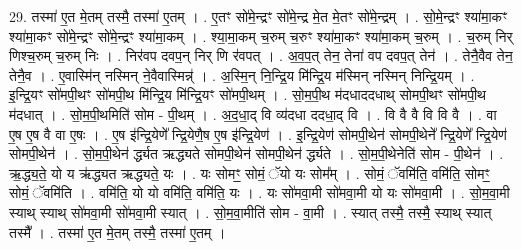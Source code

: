 \documentclass[17pt]{extarticle}
\begin{document}
29. तस्मा॑ ए॒त मे॒तम् तस्मै॒ तस्मा॑ ए॒तम् । . ए॒तꣳ सो॑मे॒न्द्रꣳ सो॑मे॒न्द्र मे॒त मे॒तꣳ सो॑मे॒न्द्रम् । . सो॒मे॒न्द्रꣳ श्या॑मा॒कꣳ श्या॑मा॒कꣳ सो॑मे॒न्द्रꣳ सो॑मे॒न्द्रꣳ श्या॑मा॒कम् । . श्या॒मा॒कम् च॒रुम् च॒रुꣳ श्या॑मा॒कꣳ श्या॑मा॒कम् च॒रुम् । . च॒रुम् निर् णिश्च॒रुम् च॒रुम् निः । . निर॑वप दवप॒न् निर् णि र॑वपत् । . अ॒व॒प॒त् तेन॒ तेना॑ वप दवप॒त् तेन॑ । . तेनै॒वैव तेन॒ तेनै॒व । . ए॒वास्मि॑न् नस्मिन् ने॒वैवास्मिन्न्॑ । . अ॒स्मि॒न् नि॒न्द्रि॒य मि॑न्द्रि॒य म॑स्मिन् नस्मिन् निन्द्रि॒यम् । . इ॒न्द्रि॒यꣳ सो॑मपी॒थꣳ सो॑मपी॒थ मि॑न्द्रि॒य मि॑न्द्रि॒यꣳ सो॑मपी॒थम् । . सो॒म॒पी॒थ म॑दधाददधाथ् सोमपी॒थꣳ सो॑मपी॒थ म॑दधात् । . सो॒म॒पी॒थमिति॑ सोम - पी॒थम् । . अ॒द॒धा॒द् वि व्य॑दधा ददधा॒द् वि । . वि वै वै वि वि वै । . वा ए॒ष ए॒ष वै वा ए॒षः । . ए॒ष इ॑न्द्रि॒येणे᳚ न्द्रि॒येणै॒ष ए॒ष इ॑न्द्रि॒येण॑ । . इ॒न्द्रि॒येण॑ सोमपी॒थेन॑ सोमपी॒थेने᳚ न्द्रि॒येणे᳚ न्द्रि॒येण॑ सोमपी॒थेन॑ । . सो॒म॒पी॒थेन॑ र्द्ध्यत ऋद्ध्यते सोमपी॒थेन॑ सोमपी॒थेन॑ र्द्ध्यते । . सो॒म॒पी॒थेनेति॑ सोम - पी॒थेन॑ । . ऋ॒द्ध्य॒ते॒ यो य ऋ॑द्ध्यत ऋद्ध्यते॒ यः । . यः सोमꣳ॒॒ सोमं॒ ॅयो यः सोम᳚म् । . सोमं॒ ॅवमि॑ति॒ वमि॑ति॒ सोमꣳ॒॒ सोमं॒ ॅवमि॑ति । . वमि॑ति॒ यो यो वमि॑ति॒ वमि॑ति॒ यः । . यः सो॑मवा॒मी सो॑मवा॒मी यो यः सो॑मवा॒मी । . सो॒म॒वा॒मी स्याथ् स्याथ् सो॑मवा॒मी सो॑मवा॒मी स्यात् । . सो॒म॒वा॒मीति॑ सोम - वा॒मी । . स्यात् तस्मै॒ तस्मै॒ स्याथ् स्यात् तस्मै᳚ । . तस्मा॑ ए॒त मे॒तम् तस्मै॒ तस्मा॑ ए॒तम् । \newline
\end{document}
